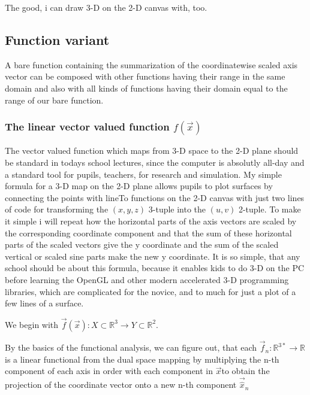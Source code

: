 \documentclass[a4paper]{article}
\begin{document}
 

The good, i can draw 3-D on the 2-D canvas with, too.



\subsection{Function variant}

A bare function containing the summarization of the coordinatewise scaled axis vector can be composed with other functions having their range in the same domain and also with all kinds of functions having their domain equal to the range of our bare function.\\

\subsubsection{The linear vector valued function $f(\vec{x})$}

The vector valued function which maps from 3-D space to the 2-D plane should be standard in todays school lectures, since
the computer is absolutly all-day and a standard tool for pupils, teachers, for research and simulation. My simple formula
for a 3-D map on the 2-D plane allows pupils to plot surfaces by connecting the points with lineTo functions on the 2-D canvas
with just two lines of code for transforming the $(x,y,z)$ 3-tuple into the $(u,v)$ 2-tuple. To make it simple i will repeat how
the horizontal parts of the axis vectors are scaled by the corresponding coordinate component and that the sum of these horizontal parts of the scaled vectors give the y coordinate and the sum of the scaled vertical or scaled sine parts make the new y coordinate.
It is so simple, that any school should be about this formula, because it enables kids to do 3-D on the PC before learning the OpenGL and other modern accelerated 3-D programming libraries, which are complicated for the novice, and to much for just a plot of a few lines of a surface.

We begin with $\vec{f}(\vec{x}) : X \subset \mathbb{R}^{3} \rightarrow Y \subset \mathbb{R}^{2}$. 

By the basics of the functional analysis, we can figure out, that each $\vec{f}_{n} : \mathbb{R}^{3*} \rightarrow \mathbb{R}$ is a linear functional from the dual space mapping by multiplying the n-th component of each axis in order with each component in $\vec{x}$to obtain the projection of the coordinate vector onto a new n-th component $\vec{\hat{x}}_n$
\end{document}
